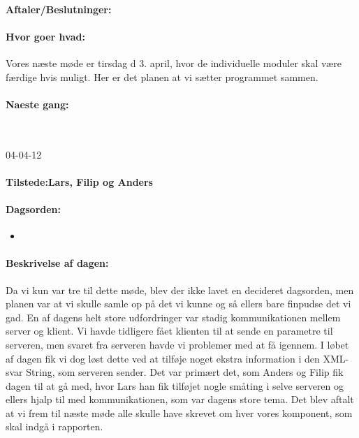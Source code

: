 \documentclass[a4paper,10pt,titlepage]{article}
\begin{document}
		\paragraph{Aftaler/Beslutninger:}
		
		\paragraph{Hvor goer hvad:}
		Vores næste møde er tirsdag d 3. april, hvor de individuelle moduler skal være færdige hvis muligt. Her er det planen at vi sætter programmet sammen.
		\paragraph{Naeste gang:}\mbox{}\\
		
		\begin{center}
		04-04-12
		\end{center}
		
		\paragraph{Tilstede:Lars, Filip og Anders}
		\paragraph{Dagsorden:}
		\begin{itemize}
					\item 
					
		\end{itemize}
		
		\paragraph{Beskrivelse af dagen:}
		Da vi kun var tre til dette møde, blev der ikke lavet en decideret dagsorden, men planen var at vi skulle samle op på det vi kunne og så ellers bare finpudse det vi gad. En af dagens helt store udfordringer var stadig kommunikationen mellem server og klient. Vi havde tidligere fået klienten til at sende en parametre til serveren, men svaret fra serveren havde vi problemer med at få igennem. I løbet af dagen fik vi dog løst dette ved at tilføje noget ekstra information i den XML-svar String, som serveren sender. Det var primært det, som Anders og Filip fik dagen til at gå med, hvor Lars han fik tilføjet nogle småting i selve serveren og ellers hjalp til med kommunikationen, som var dagens store tema. Det blev aftalt at vi frem til næste møde alle skulle have skrevet om hver vores komponent, som skal indgå i rapporten. 
\end{document}
